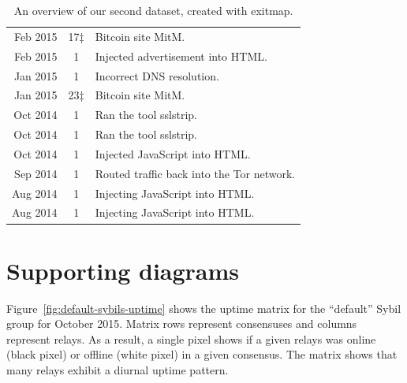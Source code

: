 \begin{table}[t]
\begin{tabular}{r c p{4cm}}
Feb 2015 & 17$\ddagger$ & Bitcoin site MitM. \\
Feb 2015 & 1 & Injected advertisement into HTML. \\
Jan 2015 & 1 & Incorrect DNS resolution. \\
Jan 2015 & 23$\ddagger$ & Bitcoin site MitM. \\
Oct 2014 & 1 & Ran the tool sslstrip. \\
Oct 2014 & 1 & Ran the tool sslstrip. \\
Oct 2014 & 1 & Injected JavaScript into HTML. \\
Sep 2014 & 1 & Routed traffic back into the Tor network. \\
Aug 2014 & 1 & Injecting JavaScript into HTML. \\
Aug 2014 & 1 & Injecting JavaScript into HTML. \\
\end{tabular}
\caption{An overview of our second dataset, created with exitmap.}
\label{tab:exitmap-dataset}
\end{table}

\section{Supporting diagrams}
Figure~\ref{fig:default-sybils-uptime} shows the uptime matrix for the
``default'' Sybil group for October 2015.  Matrix rows represent consensuses and
columns represent relays.  As a result, a single pixel shows if a given relays
was online (black pixel) or offline (white pixel) in a given consensus.  The
matrix shows that many relays exhibit a diurnal uptime pattern.

